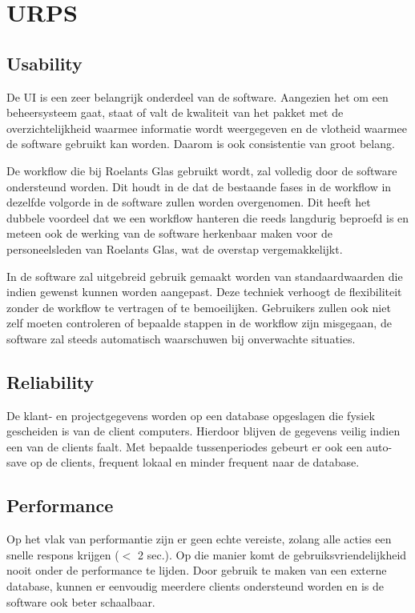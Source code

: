 \documentclass[a4paper]{article}
\begin{document}
\clearpage
\section{URPS}
\subsection{Usability}
De UI is een zeer belangrijk onderdeel van de software. Aangezien het om een beheersysteem gaat, staat of valt de kwaliteit van het pakket met de overzichtelijkheid waarmee informatie wordt weergegeven en de vlotheid waarmee de software gebruikt kan worden. Daarom is ook consistentie van groot belang. 

De workflow die bij Roelants Glas gebruikt wordt, zal volledig door de software ondersteund worden. Dit houdt in de dat de bestaande fases in de workflow in dezelfde volgorde in de software zullen worden overgenomen. Dit heeft het dubbele voordeel dat we een workflow hanteren die reeds langdurig beproefd is en meteen ook de werking van de software herkenbaar maken voor de personeelsleden van Roelants Glas, wat de overstap vergemakkelijkt.

In de software zal uitgebreid gebruik gemaakt worden van standaardwaarden die indien gewenst kunnen worden aangepast. Deze techniek verhoogt de flexibiliteit zonder de workflow te vertragen of te bemoeilijken. Gebruikers zullen ook niet zelf moeten controleren of bepaalde stappen in de workflow zijn misgegaan, de software zal steeds automatisch waarschuwen bij onverwachte situaties.

\subsection{Reliability}
De klant- en projectgegevens worden op een database opgeslagen die fysiek gescheiden is van de client computers. Hierdoor blijven de gegevens veilig indien een van de clients faalt. Met bepaalde tussenperiodes gebeurt er ook een auto-save op de clients, frequent lokaal en minder frequent naar de database.

\subsection{Performance}
Op het vlak van performantie zijn er geen echte vereiste, zolang alle acties een snelle respons krijgen ($<$ 2 sec.). Op die manier komt de gebruiksvriendelijkheid nooit onder de performance te lijden. Door gebruik te maken van een externe database, kunnen er eenvoudig meerdere clients ondersteund worden en is de software ook beter schaalbaar.
\end{document}

